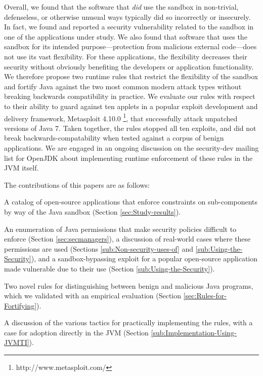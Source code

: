 \documentclass{sig-alternate}
\begin{document}
Overall, we found that the software that \emph{did} use the sandbox in
non-trivial, defenseless, or otherwise
unusual ways typically did so incorrectly or insecurely. In fact, we found and reported a
security vulnerability related to the sandbox in one of the applications under study. We also found that
software that uses the sandbox for its intended
purpose---protection from malicious external code---does not use its
vast flexibility. For these applications, the flexibility decreases their security without
obviously benefiting the developers or application functionality. We therefore propose
two runtime rules that restrict the flexibility of the sandbox and fortify Java
against the two most common modern attack types without breaking backwards
compatibility in practice. We evaluate our rules
with respect to their ability to guard against ten applets in a popular exploit development
and delivery framework, Metasploit
4.10.0%
\footnote{http://www.metasploit.com/}, that successfully attack unpatched
versions of Java 7.
Taken together, the rules stopped all ten exploits, and did not break
backwards-compatability
when tested against a corpus of benign applications.
We are engaged in an
ongoing discussion on the security-dev mailing list for OpenJDK about
implementing runtime enforcement of these rules in the JVM itself.


The contributions of this papers are as follows:
\begin{flushitem} \setlength{\parskip}{0pt}
\setlength{\parsep}{0pt}
\setlength{\itemsep}{0pt}
\item A catalog of open-source applications that enforce constraints on
sub-components by way of the Java sandbox (Section \ref{sec:Study-results}).
\item {}
\item An enumeration of Java permissions that make security policies difficult
to enforce (Section \ref{sec:secmanagers}), a discussion of real-world cases
where these permissions are used (Sections \ref{sub:Non-security-uses-of} and
\ref{sub:Using-the-Security}), and a sandbox-bypassing exploit for a popular
open-source application made vulnerable due to their use (Section
\ref{sub:Using-the-Security}).
\item Two novel rules for distinguishing between benign and malicious Java
programs, which we validated with an empirical evaluation (Section
\ref{sec:Rules-for-Fortifying}).
\item A discussion of the various tactics for practically implementing the
rules, with a case for adoption directly in the JVM (Section
\ref{sub:Implementation-Using-JVMTI}).
\end{flushitem}
\end{document}
